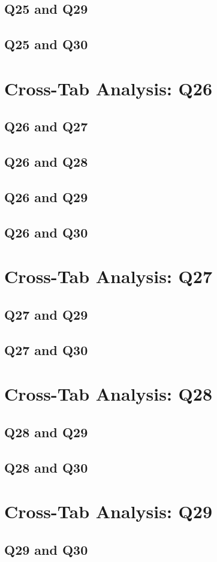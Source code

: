 \documentclass{report}
\begin{document}
\clearpage
\section{Q25 and Q29}


\clearpage
\section{Q25 and Q30}


\chapter{Cross-Tab Analysis: Q26}
\section{Q26 and Q27}


\clearpage
\section{Q26 and Q28}


\clearpage
\section{Q26 and Q29}


\clearpage
\section{Q26 and Q30}


\chapter{Cross-Tab Analysis: Q27}
\section{Q27 and Q29}


\clearpage
\section{Q27 and Q30}


\chapter{Cross-Tab Analysis: Q28}
\section{Q28 and Q29}


\clearpage
\section{Q28 and Q30}


\chapter{Cross-Tab Analysis: Q29}
\section{Q29 and Q30}




\end{document}
